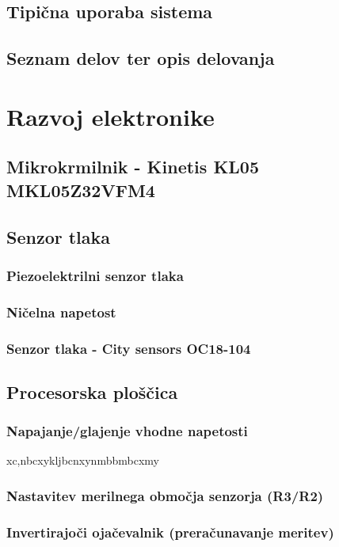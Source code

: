 \documentclass[11pt,fleqn]{book}
\begin{document}
\section{Tipična uporaba sistema}
\section{Seznam delov ter opis delovanja}

\chapter{Razvoj elektronike}
\section{Mikrokrmilnik - Kinetis KL05 MKL05Z32VFM4}
\section{Senzor tlaka}
\subsection{Piezoelektrilni senzor tlaka}
\subsection{Ničelna napetost}
\subsection{Senzor tlaka - City sensors OC18-104}
\section{Procesorska ploščica} %
\subsection{Napajanje/glajenje vhodne napetosti}
xc,nbcxykljbcnxynmbbmbcxmy
\subsection{Nastavitev merilnega območja senzorja (R3/R2)}
\subsection{Invertirajoči ojačevalnik (preračunavanje meritev)}
\end{document}
